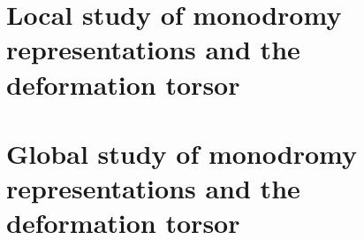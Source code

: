 \section{Local study of monodromy representations and the deformation torsor}

\section{Global study of monodromy representations and the deformation torsor}